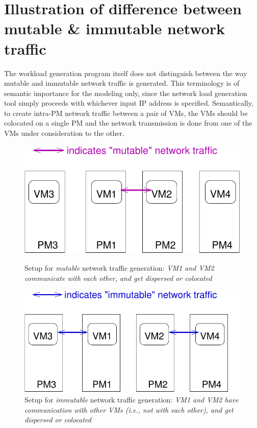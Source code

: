 \section{Illustration of difference between mutable \& immutable network traffic}
The workload generation program itself
does not distinguish between the way mutable and 
immutable
network traffic is generated. This terminology
is of semantic importance for the modeling only, 
since the network load generation tool simply
proceeds with whichever input IP address is specified. 
Semantically, to create intra-PM network traffic between a pair of VMs, 
the VMs should be colocated on a single PM and 
the network transmission
is done from one of the VMs under consideration
to the other. 

\begin{figure}
    \RawFloats
    \begin{minipage}{0.45\textwidth}
    \centering
    \includegraphics[scale=0.6]{figures/mutable-setup.pdf}
    \caption{Setup for \textit{mutable} network traffic generation: \textit{VM1 and VM2 communicate with each other, and get dispersed or colocated}}
    \label{fig:mutable-setup}
    \end{minipage}
    \hfill
    \begin{minipage}{0.45\textwidth}
    \centering
    \includegraphics[scale=0.6]{figures/immutable-setup.pdf}
    \caption{Setup for \textit{immutable} network traffic generation: \textit{VM1 and VM2 have communication with other VMs (i.e., not with each other), and get dispersed or colocated}}
    \label{fig:immutable-setup}
    \end{minipage}
\end{figure}

